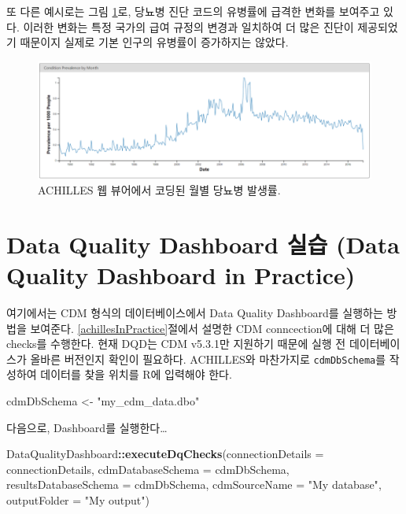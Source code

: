\documentclass[11pt]{book}
\newenvironment{Shaded}{\begin{snugshade}}{\end{snugshade}}
\newcommand{\KeywordTok}[1]{\textcolor[rgb]{0.13,0.29,0.53}{\textbf{#1}}}
\newcommand{\DataTypeTok}[1]{\textcolor[rgb]{0.13,0.29,0.53}{#1}}
\newcommand{\StringTok}[1]{\textcolor[rgb]{0.31,0.60,0.02}{#1}}
\newcommand{\OperatorTok}[1]{\textcolor[rgb]{0.81,0.36,0.00}{\textbf{#1}}}
\newcommand{\NormalTok}[1]{#1}
\theoremstyle{definition}
\theoremstyle{definition}
\theoremstyle{definition}
\theoremstyle{remark}
\begin{document}
또 다른 예시로는 그림 \ref{fig:achillesCodeChange}로, 당뇨병 진단 코드의
유병률에 급격한 변화를 보여주고 있다. 이러한 변화는 특정 국가의 급여
규정의 변경과 일치하여 더 많은 진단이 제공되었기 때문이지 실제로 기본
인구의 유병률이 증가하지는 않았다.

\begin{figure}

{\centering \includegraphics[width=1\linewidth]{images/DataQuality/achillesCodeChange} 

}

\caption{ACHILLES 웹 뷰어에서 코딩된 월별 당뇨병 발생률.}\label{fig:achillesCodeChange}
\end{figure}

\section{Data Quality Dashboard 실습 (Data Quality Dashboard in
Practice)}\label{dqdInPractice}

여기에서는 CDM 형식의 데이터베이스에서 Data Quality Dashboard를 실행하는
방법을 보여준다. \ref{achillesInPractice}절에서 설명한 CDM conncection에
대해 더 많은 checks를 수행한다. 현재 DQD는 CDM v5.3.1만 지원하기 때문에
실행 전 데이터베이스가 올바른 버전인지 확인이 필요하다. ACHILLES와
마찬가지로 \texttt{cdmDbSchema}를 작성하여 데이터를 찾을 위치를 R에
입력해야 한다.

\begin{Shaded}
\begin{Highlighting}[]
\NormalTok{cdmDbSchema <-}\StringTok{ "my_cdm_data.dbo"}
\end{Highlighting}
\end{Shaded}

다음으로, Dashboard를 실행한다\ldots{}

\begin{Shaded}
\begin{Highlighting}[]
\NormalTok{DataQualityDashboard}\OperatorTok{::}\KeywordTok{executeDqChecks}\NormalTok{(}\DataTypeTok{connectionDetails =}\NormalTok{ connectionDetails, }
                                      \DataTypeTok{cdmDatabaseSchema =}\NormalTok{ cdmDbSchema, }
                                      \DataTypeTok{resultsDatabaseSchema =}\NormalTok{ cdmDbSchema,}
                                      \DataTypeTok{cdmSourceName =} \StringTok{"My database"}\NormalTok{,}
                                      \DataTypeTok{outputFolder =} \StringTok{"My output"}\NormalTok{)}
\end{Highlighting}
\end{Shaded}
\end{document}
